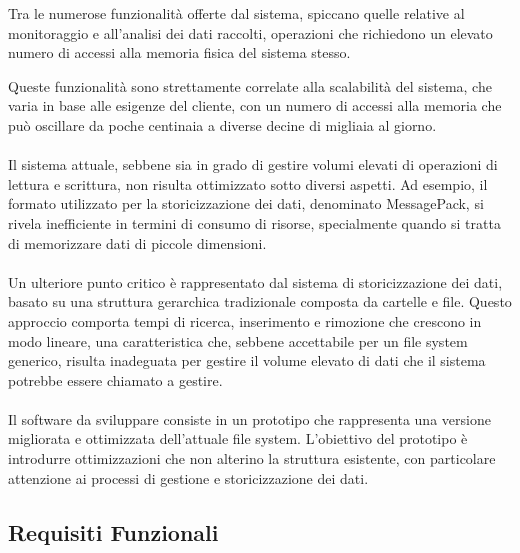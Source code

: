 \documentclass[12pt,a4paper,openright,twoside]{book}
\begin{document}
        Tra le numerose funzionalità offerte dal sistema, spiccano quelle relative al monitoraggio e all'analisi dei dati raccolti, operazioni che richiedono un elevato numero di accessi alla memoria fisica del sistema stesso.

        Queste funzionalità sono strettamente correlate alla scalabilità del sistema, che varia in base alle esigenze del cliente, con un numero di accessi alla memoria che può oscillare da poche centinaia a diverse decine di migliaia al giorno.

        \paragraph*{}

        Il sistema attuale, sebbene sia in grado di gestire volumi elevati di operazioni di lettura e scrittura, non risulta ottimizzato sotto diversi aspetti. Ad esempio, il formato utilizzato per la storicizzazione dei dati, denominato MessagePack, si rivela inefficiente in termini di consumo di risorse, specialmente quando si tratta di memorizzare dati di piccole dimensioni.

        \paragraph*{}

        Un ulteriore punto critico è rappresentato dal sistema di storicizzazione dei dati, basato su una struttura gerarchica tradizionale composta da cartelle e file. Questo approccio comporta tempi di ricerca, inserimento e rimozione che crescono in modo lineare, una caratteristica che, sebbene accettabile per un file system generico, risulta inadeguata per gestire il volume elevato di dati che il sistema potrebbe essere chiamato a gestire.

        \paragraph*{}

        Il software da sviluppare consiste in un prototipo che rappresenta una versione migliorata e ottimizzata dell'attuale file system. L'obiettivo del prototipo è introdurre ottimizzazioni che non alterino la struttura esistente, con particolare attenzione ai processi di gestione e storicizzazione dei dati.

        \subsection{Requisiti Funzionali}
\end{document}
